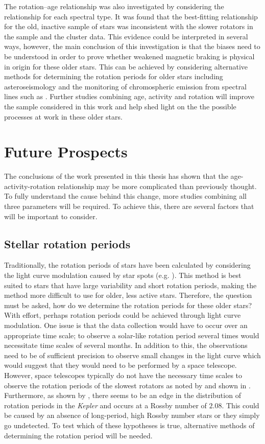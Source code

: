 The rotation--age relationship was also investigated by considering the relationship for each spectral type. It was found that the best-fitting relationship for the old, inactive sample of stars was inconsistent with the slower rotators in the sample and the cluster data. This evidence could be interpreted in several ways, however, the main conclusion of this investigation is that the biases need to be understood in order to prove whether weakened magnetic braking is physical in origin for these older stars. This can be achieved by considering alternative methods for determining the rotation periods for older stars including  asteroseismology and the monitoring of chromospheric emission from spectral lines such as \caII. Further studies combining age, activity and rotation will improve the sample considered in this work and help shed light on the the possible processes at work in these older stars.

\section{Future Prospects}

The conclusions of the work presented in this thesis has shown that the age-activity-rotation relationship may be more complicated than previously thought. To fully understand the cause behind this change, more studies combining all three parameters will be required. To achieve this, there are several factors that will be important to consider.

\subsection{Stellar rotation periods}

Traditionally, the rotation periods of stars have been calculated by considering the light curve modulation caused by star spots (e.g. \citealt{McQuillan_etal_2014}). This method is best suited to stars that have large variability and short rotation periods, making the method more difficult to use for older, less active stars. Therefore, the question must be asked, how do we determine the rotation periods for these older stars? With effort, perhaps rotation periods could be achieved through light curve modulation. One issue is that the data collection would have to occur over an appropriate time scale; to observe a solar-like rotation period several times would necessitate time scales of several months. In addition to this, the observations need to be of sufficient precision to observe small changes in the light curve which would suggest that they would need to be performed by a space telescope. However, space telescopes typically do not have the necessary time scales to observe the rotation periods of the slowest rotators as noted by \citet{Barnes_etal_2016} and shown in \citet{Esselstein_etal_2018}. Furthermore, as shown by \citet{van_Saders_etal_2019}, there seems to be an edge in the distribution of rotation periods in the \textit{Kepler} and occurs at a Rossby number of $2.08$. This could be caused by an absence of long-period, high Rossby number stars or they simply go undetected. To test which of these hypotheses is true, alternative methods of determining the rotation period will be needed.

